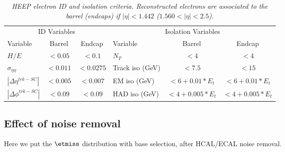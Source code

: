 \begin{table}[htbp]
 \label{tab:HEEPselection}
 \begin{center}
   \begin{tabular}{|lcc|lcc|} \hline
     \multicolumn{3}{|c|}{ID Variables} & \multicolumn{3}{|c|}{Isolation Variables} \\
     Variable & Barrel & Endcap & Variable & Barrel & Endcap  \\ \hline
     $H/E$  & $<0.05$ & $<0.1$ & $N_T$  & $<4$ & $<4$ \\ \hline
     $\sigma_{\eta\eta}$  & $<0.011$ & $<0.0275$ & Track iso (GeV) & $<7.5$ & $<15$ \\ \hline
     $|\Delta\eta^{trk-SC}|$ & $<0.005$ & $<0.007$ & EM iso (GeV) & $<6+0.01*E_{t}$ & $<6+0.01*E_{t}$ \\ \hline
     $|\Delta\phi^{trk-SC}|$ & $<0.09$ & $<0.09$ & HAD iso (GeV) & $<4+0.005*E_{t}$ & $<4+0.005*E_{t}$ \\ \hline
   \end{tabular}
 \caption{\small \sl HEEP electron ID and isolation criteria.
   Reconstructed electrons are associated to the
   barrel (endcaps) if $|\eta|<1.442$ ($1.560<|\eta|<2.5$).}
 \end{center}
\end{table}


\subsection{Effect of noise removal}
Here we put the $\etmiss$ distribution with base selection, after HCAL/ECAL
noise removal.
